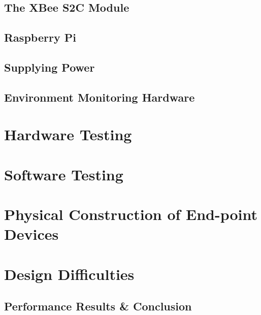 \documentclass[letter]{report}
\begin{document}
	
	\subsection{The XBee S2C Module}
		
		
	\subsection{Raspberry Pi}
		
		
	\subsection{Supplying Power}
		

	\subsection{Environment Monitoring Hardware}
		
	
	\section{Hardware Testing}
		

	\section{Software Testing}
		
	
	\section{Physical Construction of End-point Devices}
		
		
	\section{Design Difficulties}
		
		
	\subsection{Performance Results \& Conclusion}
		
	
	
\end{document}

